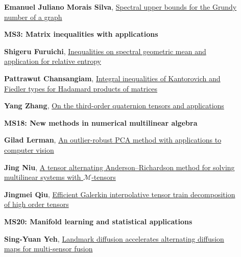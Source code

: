 \documentclass[ILAS2025-program.tex]{subfiles}
\begin{document}
\begin{description}
\begin{description}
        \item[] \hypertarget{up0143}{}\textbf{Emanuel Juliano Morais Silva}, \hyperlink{down0143}{Spectral upper bounds for the Grundy number of a graph}
        \end{description}
    \begin{description}
    \item[] {\color{mstitle}\textbf{MS3: Matrix inequalities with applications}} 
    \item[] \hypertarget{up0144}{}\textbf{Shigeru Furuichi}, \hyperlink{down0144}{Inequalities on spectral geometric mean and application for relative entropy}
        \item[] \hypertarget{up0145}{}\textbf{Pattrawut Chansangiam}, \hyperlink{down0145}{Integral inequalities of Kantorovich and Fiedler types for Hadamard products of matrices}
        \item[] \hypertarget{up0146}{}\textbf{Yang Zhang}, \hyperlink{down0146}{On the third-order quaternion tensors and applications
}
        \end{description}
    \begin{description}
    \item[] {\color{mstitle}\textbf{MS18: New methods in numerical multilinear algebra}} 
    \item[] \hypertarget{up0147}{}\textbf{Gilad Lerman}, \hyperlink{down0147}{An outlier-robust PCA method with applications to computer vision
}
        \item[] \hypertarget{up0148}{}\textbf{Jing Niu}, \hyperlink{down0148}{A tensor alternating Anderson--Richardson method for solving multilinear systems with $ \mathcal{M} $-tensors}
        \item[] \hypertarget{up0149}{}\textbf{Jingmei Qiu}, \hyperlink{down0149}{Efficient Galerkin interpolative tensor train decomposition of high order tensors
}
        \end{description}
    \begin{description}
    \item[] {\color{mstitle}\textbf{MS20: Manifold learning and statistical applications}} 
    \item[] \hypertarget{up0150}{}\textbf{Sing-Yuan Yeh}, \hyperlink{down0150}{Landmark diffusion accelerates alternating diffusion maps for multi-sensor fusion}

\end{description}
\end{description}
\end{document}
